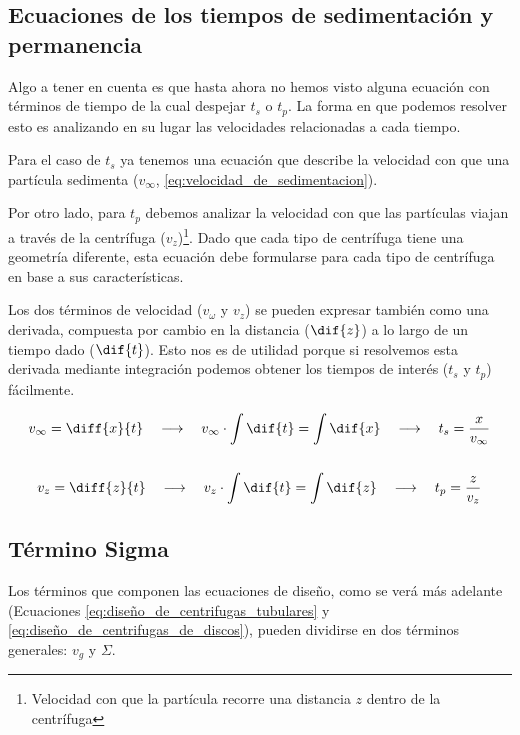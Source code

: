 \documentclass{AsignaturaResumen}
\begin{document}
\subsection{Ecuaciones de los tiempos de sedimentación y permanencia}

Algo a tener en cuenta es que hasta ahora no hemos visto alguna ecuación con términos de tiempo de la cual despejar $t_{s}$ o $t_{p}$. La forma en que podemos resolver esto es analizando en su lugar las velocidades relacionadas a cada tiempo.

Para el caso de $t_{s}$ ya tenemos una ecuación que describe la velocidad con que una partícula sedimenta ($v_{\infty}$, \autoref{eq:velocidad_de_sedimentacion}).

Por otro lado, para $t_{p}$ debemos analizar la velocidad con que las partículas viajan a través de la centrífuga ($v_{z}$)\footnote{Velocidad con que la partícula recorre una distancia $z$ dentro de la centrífuga}. Dado que cada tipo de centrífuga tiene una geometría diferente, esta ecuación debe formularse para cada tipo de centrífuga en base a sus características.

Los dos términos de velocidad ($v_{\omega}$ y $v_{z}$) se pueden expresar también como una derivada, compuesta por cambio en la distancia ($\dif{z}$) a lo largo de un tiempo dado ($\dif{t}$). Esto nos es de utilidad porque si resolvemos esta derivada mediante integración podemos obtener los tiempos de interés ($t_{s}$ y $t_{p}$) fácilmente.

\begin{gather*}
    v_{\infty} = \diff{x}{t} \quad\longrightarrow\quad v_{\infty} \cdot \int{\dif{t}} = \int{\dif{x}} \quad\longrightarrow\quad t_{s} = \frac{x}{v_{\infty}}
    \\\\
    v_{z} = \diff{z}{t} \quad\longrightarrow\quad v_{z} \cdot \int{\dif{t}} = \int{\dif{z}} \quad\longrightarrow\quad t_{p} = \frac{z}{v_{z}}
\end{gather*}



\subsection{Término Sigma}\label{sec:sigma}

Los términos que componen las ecuaciones de diseño, como se verá más adelante (Ecuaciones \autoref{eq:diseño_de_centrifugas_tubulares} y \autoref{eq:diseño_de_centrifugas_de_discos}), pueden dividirse en dos términos generales: $v_{g}$ y $\Sigma$. 
\end{document}
